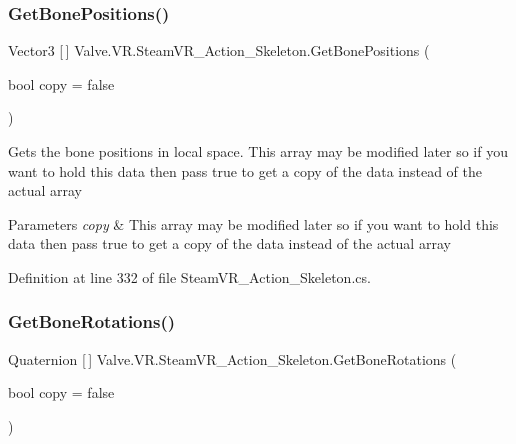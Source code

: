 \mbox{\label{class_valve_1_1_v_r_1_1_steam_v_r___action___skeleton_a60b0e6ad569249120cd0fdfb25086cc2}} 
\subsubsection{\texorpdfstring{GetBonePositions()}{GetBonePositions()}}
{\footnotesize\ttfamily Vector3 \mbox{[}$\,$\mbox{]} Valve.\+V\+R.\+Steam\+V\+R\+\_\+\+Action\+\_\+\+Skeleton.\+Get\+Bone\+Positions (\begin{DoxyParamCaption}\item[{bool}]{copy = {\ttfamily false} }\end{DoxyParamCaption})}



Gets the bone positions in local space. This array may be modified later so if you want to hold this data then pass true to get a copy of the data instead of the actual array 


\begin{DoxyParams}{Parameters}
{\em copy} & This array may be modified later so if you want to hold this data then pass true to get a copy of the data instead of the actual array\\
\hline
\end{DoxyParams}


Definition at line 332 of file Steam\+V\+R\+\_\+\+Action\+\_\+\+Skeleton.\+cs.

\mbox{\label{class_valve_1_1_v_r_1_1_steam_v_r___action___skeleton_ab195a41d6c0787b46d94ed089b42294b}} 
\subsubsection{\texorpdfstring{GetBoneRotations()}{GetBoneRotations()}}
{\footnotesize\ttfamily Quaternion \mbox{[}$\,$\mbox{]} Valve.\+V\+R.\+Steam\+V\+R\+\_\+\+Action\+\_\+\+Skeleton.\+Get\+Bone\+Rotations (\begin{DoxyParamCaption}\item[{bool}]{copy = {\ttfamily false} }\end{DoxyParamCaption})}



